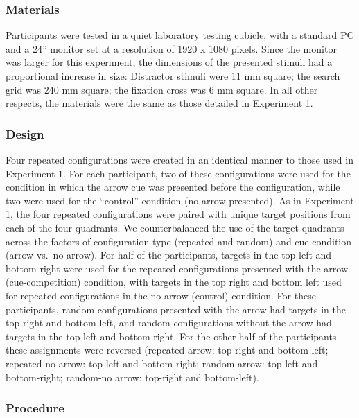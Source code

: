 \documentclass[
  man,
  floatsintext,
  longtable,
  nolmodern,
  notxfonts,
  notimes,
  colorlinks=true,linkcolor=blue,citecolor=blue,urlcolor=blue]{apa7}
\begin{document}
\subsubsection{Materials}\label{materials-1}

Participants were tested in a quiet laboratory testing cubicle, with a
standard PC and a 24'' monitor set at a resolution of 1920 x 1080
pixels. Since the monitor was larger for this experiment, the dimensions
of the presented stimuli had a proportional increase in size: Distractor
stimuli were 11 mm square; the search grid was 240 mm square; the
fixation cross was 6 mm square. In all other respects, the materials
were the same as those detailed in Experiment 1.

\subsubsection{Design}\label{design-1}

Four repeated configurations were created in an identical manner to
those used in Experiment 1. For each participant, two of these
configurations were used for the condition in which the arrow cue was
presented before the configuration, while two were used for the
``control'' condition (no arrow presented). As in Experiment 1, the four
repeated configurations were paired with unique target positions from
each of the four quadrants. We counterbalanced the use of the target
quadrants across the factors of configuration type (repeated and random)
and cue condition (arrow vs.~no-arrow). For half of the participants,
targets in the top left and bottom right were used for the repeated
configurations presented with the arrow (cue-competition) condition,
with targets in the top right and bottom left used for repeated
configurations in the no-arrow (control) condition. For these
participants, random configurations presented with the arrow had targets
in the top right and bottom left, and random configurations without the
arrow had targets in the top left and bottom right. For the other half
of the participants these assignments were reversed (repeated-arrow:
top-right and bottom-left; repeated-no arrow: top-left and bottom-right;
random-arrow: top-left and bottom-right; random-no arrow: top-right and
bottom-left).

\subsubsection{Procedure}\label{procedure-1}
\end{document}
